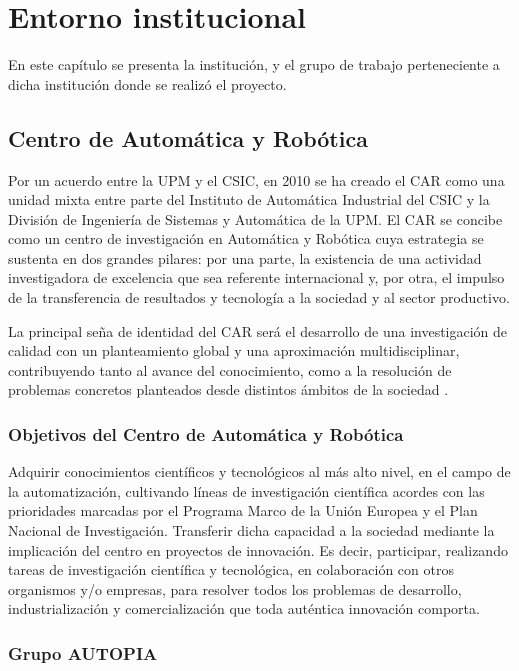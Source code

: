 \chapter{Entorno institucional} 

En este capítulo se presenta la institución, y el grupo de trabajo perteneciente a dicha institución donde se realizó el proyecto. 

\section{Centro de Automática y Robótica}

	Por un acuerdo entre la \gls{UPM} y el \gls{CSIC}, en 2010 se ha creado el \gls{CAR} como una unidad mixta entre parte del Instituto de Automática Industrial del \gls{CSIC} y la División de Ingeniería de Sistemas y Automática de la \gls{UPM}. El \gls{CAR} se concibe como un centro de investigación en Automática y Robótica cuya estrategia se sustenta en dos grandes pilares: por una parte, la existencia de una actividad investigadora de excelencia que sea referente internacional y, por otra, el impulso de la transferencia de resultados y tecnología a la sociedad y al sector productivo.
	
	La principal seña de identidad del \gls{CAR} será el desarrollo de una investigación de calidad con un planteamiento global y una aproximación multidisciplinar, contribuyendo tanto al avance del conocimiento, como a la resolución de problemas concretos planteados desde distintos ámbitos de la sociedad \cite{car}.
	
\subsection{Objetivos del Centro de Automática y Robótica}

Adquirir conocimientos científicos y tecnológicos al más alto nivel, en el campo de la automatización, cultivando líneas de investigación científica acordes con las prioridades marcadas por el Programa Marco de la Unión Europea y el Plan Nacional de Investigación. Transferir dicha capacidad a la sociedad mediante la implicación del centro en proyectos de innovación. Es decir, participar, realizando tareas de investigación científica y tecnológica, en colaboración con otros organismos y/o empresas, para resolver todos los problemas de desarrollo, industrialización y comercialización que toda auténtica innovación comporta.

\subsection{Grupo AUTOPIA}

